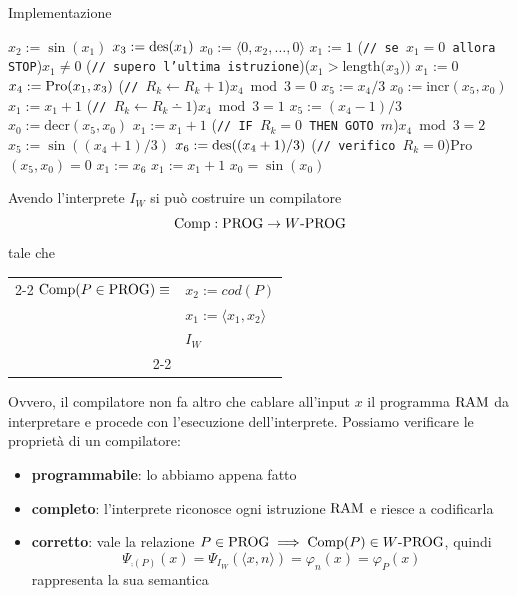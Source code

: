 Implementazione 
\begin{tcolorbox}[colback=white,sharp corners,boxrule=.3mm]
	\begin{algorithm}[H]
		\SetAlgoNoEnd
		$x_2 := \sin(x_1)$\;
		$x_3 := \operatorname{des}(x_1)$\;
		$x_0 := \langle 0,x_2,\dots,0 \rangle$\;
		$x_1 := 1$\;
		\While(\hfill\texttt{// se $x_1=0$ allora STOP}){$x_1\neq 0$}{
			\eIf(\hfill\texttt{// supero l'ultima istruzione}){($x_1>\text{length($x_3$))}$}{
				$x_1:=0$
			}{
				$x_4 := \text{Pro}(x_1,x_3)$
				\If(\hfill\texttt{// }$R_k\leftarrow R_k+1$){$x_4\bmod{3}=0$}{
					$x_5 := x_4 / 3$
					$x_0 := \text{incr}(x_5,x_0)$\;
					$x_1 := x_1+1$\;
				}
				\If(\hfill\texttt{// }$R_k\leftarrow R_k\dotminus1$){$x_4\bmod{3}=1$}{
					$x_5 := (x_4-1) / 3$
					$x_0 := \text{decr}(x_5,x_0)$\;
					$x_1 := x_1+1$\;
				}
				\If(\hfill\texttt{// IF $R_k=0$ THEN GOTO $m$}){$x_4\bmod{3}=2$}{
					$x_5 := \sin((x_4+1)/3)$
					$x_6 := \operatorname{des}((x_4+1)/3)$
					\eIf(\hfill\texttt{// verifico }$R_k=0$){Pro$(x_5,x_0)=0$}{
						$x_1:=x_6$\;
					}{
						$x_1:=x_1+1$\;
					}
				}
			}
		}
		$x_0 = \sin(x_0)$
	\end{algorithm}
\end{tcolorbox}

Avendo l'interprete $I_W$ si può costruire un compilatore
$$ \text{Comp}: \text{PROG} \rightarrow W\text{-PROG} $$
tale che 
\begin{center}
	\begin{tabular}{r|l|}
		\cline{2-2}
		$\text{Comp} (P \in \text{PROG}) \equiv$	& $x_2 := cod(P)$ \\
			& $x_1 := \langle x_1, x_2 \rangle$ \\
			& $I_W$ \\
		\cline{2-2}
	\end{tabular}
\end{center}

Ovvero, il compilatore non fa altro che cablare all'input $x$ il programma $\text{RAM}$ da interpretare e procede con l'esecuzione dell'interprete. Possiamo verificare le proprietà di un compilatore: 
\begin{itemize}
	\item \textbf{programmabile}: lo abbiamo appena fatto
	\item \textbf{completo}: l'interprete riconosce ogni istruzione $\text{RAM}$ e riesce a codificarla
	\item \textbf{corretto}: vale la relazione $P \in \text{PROG} \implies \text{Comp} (P) \in W\text{-PROG}$, quindi
	$$ \Psi_{\comp (P)} (x) = \Psi_{I_W} (\langle x,n \rangle) = \varphi_n (x) = \varphi_P (x) $$
	rappresenta la sua semantica
\end{itemize}

